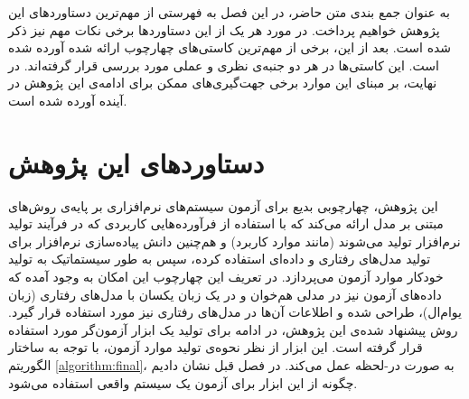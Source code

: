 به عنوان جمع بندی متن حاضر، در این فصل به فهرستی از مهم‌ترین دستاوردهای این پژوهش خواهیم پرداخت. در مورد هر یک از این دستاوردها برخی نکات مهم نیز ذکر شده است. بعد از این، برخی از مهم‌ترین کاستی‌های چهارچوب ارائه شده آورده شده است. این کاستی‌ها در هر دو جنبه‌ی نظری و عملی مورد بررسی قرار گرفته‌اند. در نهایت، بر مبنای این موارد برخی جهت‌گیری‌های ممکن برای ادامه‌ی این پژوهش در آینده آورده شده است.

\section{دستاوردهای این پژوهش}
این پژوهش، چهارچوبی بدیع برای آزمون سیستم‌های نرم‌افزاری بر پایه‌ی روش‌های مبتنی بر مدل ارائه می‌کند که با استفاده از فرآورده‌هایی کاربردی که در فرآیند تولید نرم‌افزار تولید می‌شوند (مانند موارد کاربرد) و هم‌چنین دانش پیاده‌سازی نرم‌افزار برای تولید مدل‌های رفتاری و داده‌ای استفاده کرده، سپس به طور سیستماتیک به تولید خودکار موارد آزمون می‌پردازد. در تعریف این چهارچوب این امکان به وجود آمده که داده‌های آزمون نیز در مدلی هم‌خوان و در یک زبان یکسان با مدل‌های رفتاری (زبان یو‌ام‌ال)، طراحی شده و اطلاعات آن‌ها در مدل‌های رفتاری نیز مورد استفاده قرار گیرد. روش پیشنهاد شده‌ی این پژوهش، در ادامه برای تولید یک ابزار آزمون‌گر مورد استفاده قرار گرفته است. این ابزار از نظر نحوه‌ی تولید موارد آزمون، با توجه به ساختار الگوریتم \ref{algorithm:final}، به صورت \gls*{در-لحظه} عمل می‌کند. در فصل قبل نشان دادیم چگونه از این ابزار برای آزمون یک سیستم واقعی استفاده می‌شود.

